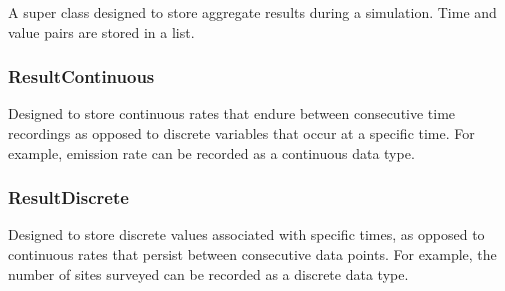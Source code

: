 \documentclass[letterpaper,10pt,english]{sphinxmanual}
\begin{document}
\begin{fulllineitems}
\label{\detokenize{index:feast.EmissionSimModules.result_classes.ResultAggregate}}
A super class designed to store aggregate results during a simulation.
Time and value pairs are stored in a list.

\end{fulllineitems}



\subsubsection{ResultContinuous}
\label{\detokenize{index:resultcontinuous}}

\begin{fulllineitems}
\label{\detokenize{index:feast.EmissionSimModules.result_classes.ResultContinuous}}
Designed to store continuous rates that endure between consecutive time recordings as opposed to discrete
variables that occur at a specific time. For example, emission rate can be recorded as a continuous data type.

\end{fulllineitems}



\subsubsection{ResultDiscrete}
\label{\detokenize{index:resultdiscrete}}

\begin{fulllineitems}
\label{\detokenize{index:feast.EmissionSimModules.result_classes.ResultDiscrete}}
Designed to store discrete values associated with specific times, as opposed to continuous rates that persist
between consecutive data points. For example, the number of sites surveyed can be recorded as a discrete data type.

\end{fulllineitems}
\end{document}
